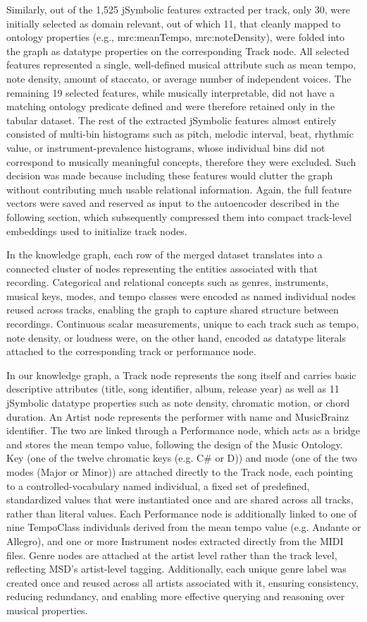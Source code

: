 Similarly, out of the 1,525 jSymbolic features extracted per track, only 30, were initially selected as domain relevant, out of which 11, that cleanly mapped to ontology properties (e.g., mrc:meanTempo, mrc:noteDensity), were folded into the graph as datatype properties on the corresponding Track node. All selected features represented a single, well-defined musical attribute such as mean tempo, note density, amount of staccato, or average number of independent voices. The remaining 19 selected features, while musically interpretable, did not have a matching ontology predicate defined and were therefore retained only in the tabular dataset. The rest of the extracted jSymbolic features almost entirely consisted of multi-bin histograms such as pitch, melodic interval, beat, rhythmic value, or instrument-prevalence histograms, whose individual bins did not correspond to musically meaningful concepts, therefore they were excluded. Such decision was made because including these features would clutter the graph without contributing much usable relational information. Again, the full feature vectors were saved and reserved as input to the autoencoder described in the following section, which subsequently compressed them into compact track-level embeddings used to initialize track nodes.

In the knowledge graph, each row of the merged dataset translates into a connected cluster of nodes representing the entities associated with that recording. Categorical and relational concepts such as genres, instruments, musical keys, modes, and tempo classes were encoded as named individual nodes reused across tracks, enabling the graph to capture shared structure between recordings. Continuous scalar measurements, unique to each track such as tempo, note density, or loudness were, on the other hand, encoded as datatype literals attached to the corresponding track or performance node. 

In our knowledge graph, a Track node represents the song itself and carries basic descriptive attributes (title, song identifier, album, release year) as well as 11 jSymbolic datatype properties such as note density, chromatic motion, or chord duration. An Artist node represents the performer with name and MusicBrainz identifier. The two are linked through a Performance node, which acts as a bridge and stores the mean tempo value, following the design of the Music Ontology. Key (one of the twelve chromatic keys (e.g. C\# or D)) and mode (one of the two modes (Major or Minor)) are attached directly to the Track node, each pointing to a controlled-vocabulary named individual, a fixed set of predefined, standardized values that were instantiated once and are shared across all tracks, rather than literal values. Each Performance node is additionally linked to one of nine TempoClass individuals derived from the mean tempo value (e.g. Andante or Allegro), and one or more Instrument nodes extracted directly from the MIDI files. Genre nodes are attached at the artist level rather than the track level, reflecting MSD's artist-level tagging. Additionally, each unique genre label was created once and reused across all artists associated with it, ensuring consistency, reducing redundancy, and enabling more effective querying and reasoning over musical properties.

